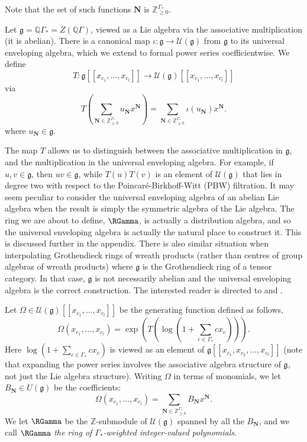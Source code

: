 Note that the set of such functions $\mathbf{N}$ is $\mathbb{Z}_{\geq 0}^{\Gamma_*}$. 
\begin{definition}
Let $\mathfrak{g} = \mathbb{Q}\Gamma_* = Z(\mathbb{Q}\Gamma)$, viewed as a Lie algebra via the associative multiplication \textup{(}it is abelian\textup{)}. There is a canonical map $\iota: \mathfrak{g} \to \mathcal{U}(\mathfrak{g})$ from $\mathfrak{g}$ to its universal enveloping algebra, which we extend to formal power series coefficientwise. We define
\[
T: \mathfrak{g}[[x_{c_1}, \ldots, x_{c_l}]] \to \mathcal{U}(\mathfrak{g})[[x_{c_1},  \ldots, x_{c_l}]]
\]
via
\[
T\left(
\sum_{\mathbf{N} \in \mathbb{Z}_{\geq 0}^{\Gamma_*}} u_{\mathbf{N}} x^{\mathbf{N}}
\right) = \sum_{\mathbf{N} \in \mathbb{Z}_{\geq 0}^{\Gamma_*}} \iota(u_{\mathbf{N}}) x^{\mathbf{N}}.
\]
where $u_{\mathbf{N}} \in \mathfrak{g}$.
\end{definition}
\begin{remark}
The map $T$ allows us to distinguish between the associative multiplication in $\mathfrak{g}$, and the multiplication in the universal enveloping algebra. For example, if $u, v \in \mathfrak{g}$, then $uv \in \mathfrak{g}$, while $T(u)T(v)$ is an element of $\mathcal{U}(\mathfrak{g})$ that lies in degree two with respect to the Poincar\'{e}-Birkhoff-Witt (PBW) filtration. It may seem peculiar to consider the universal enveloping algebra of an abelian Lie algebra when the result is simply the symmetric algebra of the Lie algebra. The ring we are about to define, $\RGamma$, is actually a distribution algebra, and so the universal enveloping algebra is actually the natural place to construct it. This is discussed further in the appendix. There is also similar situation when interpolating Grothendieck rings of wreath products (rather than centres of group algebras of wreath products) where $\mathfrak{g}$ is the Grothendieck ring of a tensor category. In that case, $\mathfrak{g}$ is not necessarily abelian and the universal enveloping algebra is the correct construction. The interested reader is directed to \cite{Ryba1} and \cite{Ryba2}.
\end{remark}
\begin{definition} \label{rgamma_constr_defn}
Let $\Omega \in \mathcal{U}(\mathfrak{g})[[x_{c_1}, \ldots, x_{c_l}]]$ be the generating function defined as follows,
\[
\Omega(x_{c_1}, \ldots, x_{c_l}) = \exp\left(T\left(\log\left(1 + \sum_{c \in \Gamma_*} c x_c\right)\right)\right).
\]
Here $\log\left(1 + \sum_{c \in \Gamma_*} c x_c\right)$ is viewed as an element of $\mathfrak{g}[[x_{c_1}, x_{c_2}, \ldots, x_{c_l}]]$ \textup{(}note that expanding the power series involves the associative algebra structure of $\mathfrak{g}$, not just the Lie algebra structure\textup{)}. Writing $\Omega$ in terms of monomials, we let $B_{\mathbf{N}} \in U(\mathfrak{g})$ be the coefficients:
\[
\Omega(x_{c_1}, \ldots, x_{c_l}) = \sum_{\mathbf{N} \in \mathbb{Z}_{\geq 0}^{\Gamma_*}} B_{\mathbf{N}} x^{\mathbf{N}}.
\]
We let $\RGamma$ be the $\mathbb{Z}$-submodule of $\mathcal{U}(\mathfrak{g})$ spanned by all the $B_{\mathbf{N}}$, and we call $\RGamma$ \emph{the ring of $\Gamma_*$-weighted integer-valued polynomials}.
\end{definition}

